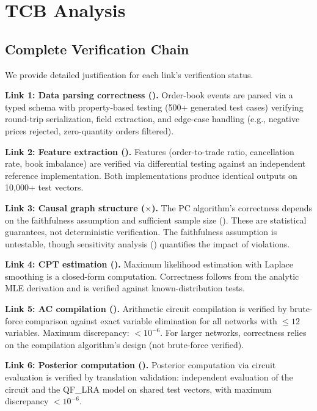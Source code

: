 \documentclass[11pt]{article}
\begin{document}
\section{TCB Analysis}
\label{app:tcb}

\subsection{Complete Verification Chain}

We provide detailed justification for each link's verification status.

\textbf{Link 1: Data parsing correctness (\checkmark).}
Order-book events are parsed via a typed schema with property-based testing (500+ generated test cases) verifying round-trip serialization, field extraction, and edge-case handling (e.g., negative prices rejected, zero-quantity orders filtered).

\textbf{Link 2: Feature extraction (\checkmark).}
Features (order-to-trade ratio, cancellation rate, book imbalance) are verified via differential testing against an independent reference implementation.
Both implementations produce identical outputs on 10,000+ test vectors.

\textbf{Link 3: Causal graph structure ($\times$).}
The PC algorithm's correctness depends on the faithfulness assumption and sufficient sample size ().
These are statistical guarantees, not deterministic verification.
The faithfulness assumption is untestable, though sensitivity analysis () quantifies the impact of violations.

\textbf{Link 4: CPT estimation (\checkmark).}
Maximum likelihood estimation with Laplace smoothing is a closed-form computation.
Correctness follows from the analytic MLE derivation and is verified against known-distribution tests.

\textbf{Link 5: AC compilation (\checkmark).}
Arithmetic circuit compilation is verified by brute-force comparison against exact variable elimination for all networks with $\leq 12$ variables.
Maximum discrepancy: $< 10^{-6}$.
For larger networks, correctness relies on the compilation algorithm's design (not brute-force verified).

\textbf{Link 6: Posterior computation (\checkmark).}
Posterior computation via circuit evaluation is verified by translation validation: independent evaluation of the circuit and the QF\_LRA model on shared test vectors, with maximum discrepancy $< 10^{-6}$.
\end{document}
